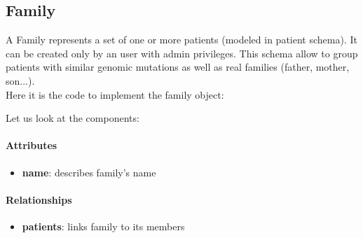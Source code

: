 \subsection{Family}
A Family represents a set of one or more patients (modeled in patient schema). It can be created only by an user with admin privileges. This schema allow to group patients with similar genomic mutations as well as real families (father, mother, son{...}).
\\Here it is the code to implement the family object: 



Let us look at the components:

\paragraph{Attributes}      
\begin{itemize}
 	\item \textbf{name}: describes family's name
\end{itemize}

\paragraph{Relationships}   
\begin{itemize}
 	\item \textbf{patients}: links family to its members
\end{itemize}



